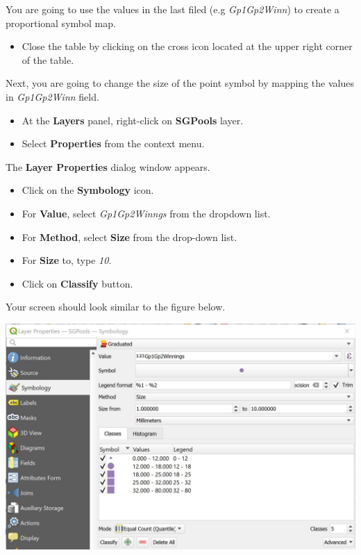 \documentclass[
  letterpaper,
  DIV=11,
  numbers=noendperiod]{scrreprt}
\providecommand{\tightlist}{%
  \setlength{\itemsep}{0pt}\setlength{\parskip}{0pt}}\usepackage{longtable,booktabs,array}
\begin{document}
You are going to use the values in the last filed (e.g
\emph{Gp1Gp2Winn}) to create a proportional symbol map.

\begin{itemize}
\tightlist
\item
  Close the table by clicking on the cross icon located at the upper
  right corner of the table.
\end{itemize}

Next, you are going to change the size of the point symbol by mapping
the values in \emph{Gp1Gp2Winn} field.

\begin{itemize}
\tightlist
\item
  At the \textbf{Layers} panel, right-click on \textbf{SGPools} layer.
\item
  Select \textbf{Properties} from the context menu.
\end{itemize}

The \textbf{Layer Properties} dialog window appears.

\begin{itemize}
\item
  Click on the \textbf{Symbology} icon.
\item
  For \textbf{Value}, select \emph{Gp1Gp2Winngs} from the dropdown list.
\item
  For \textbf{Method}, select \textbf{Size} from the drop-down list.
\item
  For \textbf{Size} to, type \emph{10}.
\item
  Click on \textbf{Classify} button.
\end{itemize}

Your screen should look similar to the figure below.

\includegraphics{./img03/image13.jpg}
\end{document}
